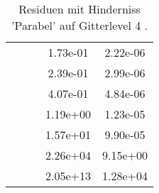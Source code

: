 \begin{table}
\begin{tabular}{c|cc|cc|}
\multicolumn{1}{|c|}{} & \multicolumn{1}{|c|}{} & \multicolumn{1}{|c|}{} & \multicolumn{1}{|c|}{  1.73e-01} & \multicolumn{1}{|c|}{  2.22e-06} \\ 
\multicolumn{1}{|c|}{} & \multicolumn{1}{|c|}{} & \multicolumn{1}{|c|}{} & \multicolumn{1}{|c|}{  2.39e-01} & \multicolumn{1}{|c|}{  2.99e-06} \\ 
\multicolumn{1}{|c|}{} & \multicolumn{1}{|c|}{} & \multicolumn{1}{|c|}{} & \multicolumn{1}{|c|}{  4.07e-01} & \multicolumn{1}{|c|}{  4.84e-06} \\ 
\multicolumn{1}{|c|}{} & \multicolumn{1}{|c|}{} & \multicolumn{1}{|c|}{} & \multicolumn{1}{|c|}{  1.19e+00} & \multicolumn{1}{|c|}{  1.23e-05} \\ 
\multicolumn{1}{|c|}{} & \multicolumn{1}{|c|}{} & \multicolumn{1}{|c|}{} & \multicolumn{1}{|c|}{  1.57e+01} & \multicolumn{1}{|c|}{  9.90e-05} \\ 
\multicolumn{1}{|c|}{} & \multicolumn{1}{|c|}{} & \multicolumn{1}{|c|}{} & \multicolumn{1}{|c|}{  2.26e+04} & \multicolumn{1}{|c|}{  9.15e+00} \\ 
\multicolumn{1}{|c|}{} & \multicolumn{1}{|c|}{} & \multicolumn{1}{|c|}{} & \multicolumn{1}{|c|}{  2.05e+13} & \multicolumn{1}{|c|}{  1.28e+04} \\ 
\hline 
\end{tabular}\caption{Residuen mit Hinderniss 'Parabel' auf Gitterlevel 4 .}\label{tab:Residuum_Parabel_level4}
\end{table} 
